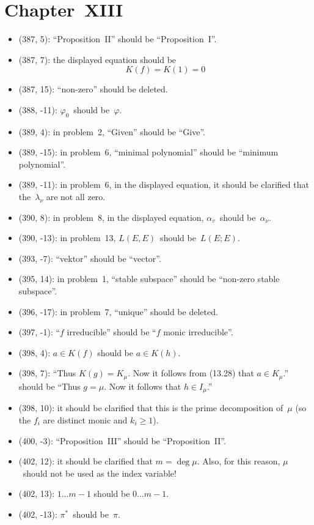\documentclass[letterpaper,12pt]{article}
\begin{document}
\section*{Chapter~XIII}
\begin{itemize}
\item (387, 5): ``Proposition~II'' should be ``Proposition~I''.
\item (387, 7): the displayed equation should be
\[K(f)=K(1)=0\]
\item (387, 15): ``non-zero'' should be deleted.
\item (388, -11): \(\varphi_0\)~should be~\(\varphi\).
\item (389, 4): in problem~2, ``Given'' should be ``Give''.
\item (389, -15): in problem~6, ``minimal polynomial'' should be ``minimum polynomial''.
\item (389, -11): in problem~6, in the displayed equation, it should be clarified that the~\(\lambda_{\nu}\) are not all zero.
\item (390, 8): in problem~8, in the displayed equation, \(\alpha_v\)~should be~\(\alpha_{\nu}\).
\item (390, -13): in problem~13, \(L(E,E)\)~should be~\(L(E;E)\).
\item (393, -7): ``vektor'' should be ``vector''.
\item (395, 14): in problem~1, ``stable subspace'' should be ``non-zero stable subspace''.
\item (396, -17): in problem~7, ``unique'' should be deleted.
\item (397, -1): ``\(f\) irreducible'' should be ``\(f\) monic irreducible''.
\item (398, 4): \(a\in K(f)\) should be \(a\in K(h)\).
\item (398, 7): ``Thus \(K(g)=K_{\mu}\). Now it follows from (13.28) that \(a\in K_{\mu}\).'' should be ``Thus \(g=\mu\). Now it follows that \(h\in I_{\mu}\).''
\item (398, 10): it should be clarified that this is the prime decomposition of~\(\mu\) (so the \(f_i\) are distinct monic and \(k_i\ge 1\)).
\item (400, -3): ``Proposition~III'' should be ``Proposition~II''.
\item (402, 12): it should be clarified that \(m=\deg\mu\). Also, for this reason, \(\mu\)~should not be used as the index variable!
\item (402, 13): \(1\dots m-1\) should be \(0\dots m-1\).
\item (402, -13): \(\pi^*\)~should be~\(\pi\).

\end{itemize}
\end{document}
